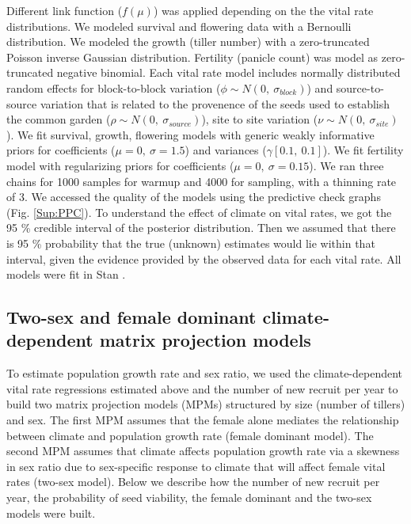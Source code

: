 \documentclass[12pt]{article}
\begin{document}
Different link function ($f(\mu)$) was applied depending on the the vital rate distributions. 
We modeled survival and flowering data with a Bernoulli distribution.
We modeled the growth (tiller number) with a zero-truncated Poisson inverse Gaussian distribution. 
Fertility (panicle count) was model as zero-truncated negative binomial. 
Each vital rate model includes normally distributed random effects for block-to-block variation ($\phi \sim N(0,\ \sigma_{block})$) and source-to-source variation that is related to the provenence of the seeds used to establish the common garden ($\rho \sim N(0,\ \sigma_{source})$), site to site variation ($\nu \sim N(0,\ \sigma_{site})$).
We fit survival, growth, flowering models with generic weakly informative priors for coefficients ($\mu = 0,\ \sigma = 1.5$) and variances ($\gamma [0.1,\ 0.1]$).
We fit fertility model with regularizing priors for coefficients ($\mu = 0,\ \sigma = 0.15$).
We ran three chains for 1000 samples for warmup and 4000 for sampling, with a thinning rate of 3.
We accessed the quality of the models using the predictive check graphs \citep{piironen2017comparison} (Fig. \ref{Sup:PPC}).
To understand the effect of climate on vital rates, we got the 95 \% credible interval of the posterior distribution.  
Then we assumed that there is 95 \% probability that the true (unknown) estimates would lie within that interval, given the evidence provided by the observed data for each vital rate.
All models were fit in Stan \citep{rstan}. 

\subsection*{Two-sex and female dominant climate-dependent matrix projection models}
To estimate population growth rate and sex ratio, we used the climate-dependent vital rate regressions estimated above and the number of new recruit per year to build two matrix projection models (MPMs) structured by size (number of tillers) and sex.
The first MPM assumes that the female alone mediates the relationship between climate and population growth rate (female dominant model). 
The second MPM assumes that climate affects population growth rate via a skewness in sex ratio due to sex-specific response to climate that will affect female vital rates (two-sex model). 
Below we describe how the number of new recruit per year, the probability of seed viability, the female dominant and the two-sex models were built.
\end{document}

